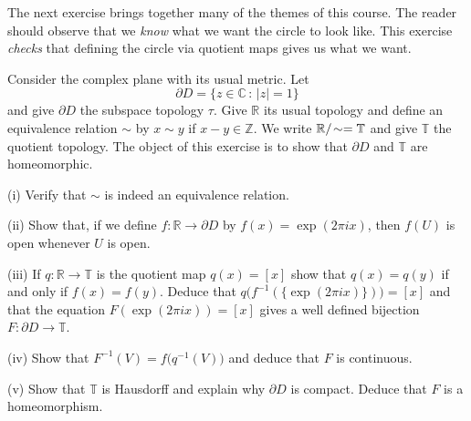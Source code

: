 The next exercise brings together many of the themes of this course.
The reader should observe that we \emph{know} what we want
the circle to look like. This exercise \emph{checks} that
defining the circle via quotient maps gives us what we want.



\begin{problem}\label{P;circle as quotient}
Consider the complex plane with its usual metric.
Let
\[{\partial}D=\{z\in{\mathbb C}\,:\,|z|=1\}\]
and give ${\partial}D$ the subspace topology $\tau$.
Give ${\mathbb R}$ its usual topology and define
an equivalence relation $\sim$ by $x\sim y$ if $x-y\in{\mathbb Z}$.
We write ${\mathbb R}/\negthinspace\sim={\mathbb T}$ and give ${\mathbb T}$
the quotient topology. The object of this exercise
is to show that ${\partial}D$ and ${\mathbb T}$ are homeomorphic.

(i) Verify that $\sim$ is indeed an equivalence relation.

(ii) Show that, if we define
$f:{\mathbb R}\rightarrow {\partial}D$
by $f(x)=\exp(2\pi ix)$, then $f(U)$ is
open whenever $U$ is open.

(iii) If $q:{\mathbb R}\rightarrow {\mathbb T}$ is the quotient map
$q(x)=[x]$ show that $q(x)=q(y)$ if and only if $f(x)=f(y)$.
Deduce that $q\big(f^{-1}(\{\exp(2\pi ix)\})\big)=[x]$
and that the equation $F(\exp(2\pi ix))=[x]$ gives a well
defined bijection $F:{\partial}D\rightarrow{\mathbb T}$.

(iv) Show that $F^{-1}(V)=f\big(q^{-1}(V)\big)$ and deduce
that $F$ is continuous.

(v) Show that ${\mathbb T}$ is Hausdorff and explain why
${\partial}D$ is compact. Deduce that $F$ is a homeomorphism.
\end{problem}
